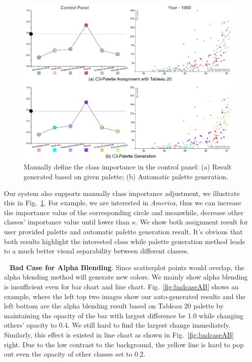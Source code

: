 \documentclass[review,onecolumn]{vgtc}                %
\newcommand{\myparagraph}[1]{\mbox{\ } \newline \noindent \textbf{#1}}
\renewcommand{\paragraph}[1]{\myparagraph{#1}}
\begin{document}
\begin{figure}[h]
\centering
\includegraphics[width=0.8\linewidth]{interaction.pdf}
\caption{Manually define the class importance in the control panel: (a) Result generated based on given palette; (b) Automatic palette generation.}
\label{fig:casestudyinteraction}
\vspace{-4mm}
\end{figure}

Our system also supports manually class importance adjustment, we illustrate this in Fig.~\ref{fig:casestudyinteraction}. For example, we are interested in \emph{America}, thus we can increase the importance value of the corresponding circle and meanwhile, decrease other classes' importance value until lower than $\kappa$. We show both assignment result for user provided palette and automatic palette generation result. It's obvious that both results highlight the interested class while palette generation method leads to a much better visual separability between different classes.

\paragraph{Bad Case for Alpha Blending}.
Since scatterplot points would overlap, the alpha blending method will generate new colors. We mainly show alpha blending is insufficient even for bar chart and line chart. Fig.~\ref{fig:badcaseAB} shows an example, where the left top two images show our auto-generated results and the left bottom are the alpha blending result based on Tableau 20 palette by maintaining the opacity of the bar with largest difference be 1.0 while changing others' opacity to 0.4. We still hard to find the largest change immediately. Similarly, this effect is existed in line chart as shown in Fig.~\ref{fig:badcaseAB} right. Due to the low contrast to the background, the yellow line is hard to pop out even the opacity of other classes set to 0.2.
\end{document}
